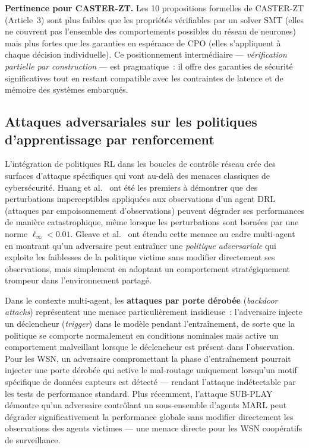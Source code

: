 \textbf{Pertinence pour CASTER-ZT.} Les 10 propositions formelles de CASTER-ZT (Article~3) sont plus faibles que les propriétés vérifiables par un solver SMT (elles ne couvrent pas l'ensemble des comportements possibles du réseau de neurones) mais plus fortes que les garanties en espérance de CPO (elles s'appliquent à chaque décision individuelle). Ce positionnement intermédiaire --- \emph{vérification partielle par construction} --- est pragmatique~: il offre des garanties de sécurité significatives tout en restant compatible avec les contraintes de latence et de mémoire des systèmes embarqués.

\subsection{Attaques adversariales sur les politiques d'apprentissage par renforcement}

L'intégration de politiques RL dans les boucles de contrôle réseau crée des surfaces d'attaque spécifiques qui vont au-delà des menaces classiques de cybersécurité. Huang et al.\ \cite{Huang2017AdvRL} ont été les premiers à démontrer que des perturbations imperceptibles appliquées aux observations d'un agent DRL (attaques par empoisonnement d'observations) peuvent dégrader ses performances de manière catastrophique, même lorsque les perturbations sont bornées par une norme $\ell_\infty < 0.01$. Gleave et al.\ \cite{Gleave2020AdvPolicies} ont étendu cette menace au cadre multi-agent en montrant qu'un adversaire peut entraîner une \emph{politique adversariale} qui exploite les faiblesses de la politique victime sans modifier directement ses observations, mais simplement en adoptant un comportement stratégiquement trompeur dans l'environnement partagé.

Dans le contexte multi-agent, les \textbf{attaques par porte dérobée} (\emph{backdoor attacks}) \cite{Kiourti2021BackdoorDRL} représentent une menace particulièrement insidieuse~: l'adversaire injecte un déclencheur (\emph{trigger}) dans le modèle pendant l'entraînement, de sorte que la politique se comporte normalement en conditions nominales mais active un comportement malveillant lorsque le déclencheur est présent dans l'observation. Pour les WSN, un adversaire compromettant la phase d'entraînement pourrait injecter une porte dérobée qui active le mal-routage uniquement lorsqu'un motif spécifique de données capteurs est détecté --- rendant l'attaque indétectable par les tests de performance standard. Plus récemment, l'attaque SUB-PLAY \cite{subplay_marl2025} démontre qu'un adversaire contrôlant un sous-ensemble d'agents MARL peut dégrader significativement la performance globale sans modifier directement les observations des agents victimes --- une menace directe pour les WSN coopératifs de surveillance.

